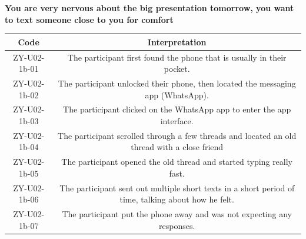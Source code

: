 \documentclass[acmsmall,screen,authorversion,nonacm]{acmart}
\begin{document}
\begin{center}
\textbf{You are very nervous about the big presentation tomorrow, you want to text someone close to you for comfort}
\begin{tabular}{|c|c|}
\hline
\textbf{Code} & \textbf{Interpretation}                                                                             \\ \hline
ZY-U02-1b-01  & The participant first found the phone that is usually in their pocket.                              \\ \hline
ZY-U02-1b-02  & The participant unlocked their phone, then located the messaging app (WhatsApp).                    \\ \hline
ZY-U02-1b-03  & The participant clicked on the WhatsApp app to enter the app interface.                             \\ \hline
ZY-U02-1b-04  & The participant scrolled through a few threads and located an old thread with a close friend        \\ \hline
ZY-U02-1b-05  & The participant opened the old thread and started typing really fast.                               \\ \hline
ZY-U02-1b-06  & The participant sent out multiple short texts in a short period of time, talking about how he felt. \\ \hline
ZY-U02-1b-07  & The participant put the phone away and was not expecting any responses.                             \\ \hline
\end{tabular}
\end{center}

\vspace{5pt}
\end{document}
